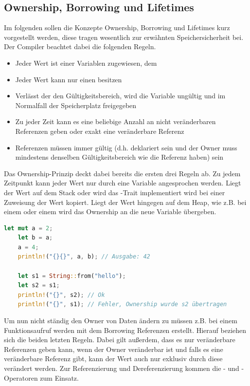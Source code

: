 \documentclass[11pt,a4paper, ngerman]{article}
\begin{document}
\subsection{Ownership, Borrowing und Lifetimes}
Im folgenden sollen die Konzepte Ownership, Borrowing und Lifetimes kurz vorgestellt werden, diese tragen wesentlich zur erwähnten Speichersicherheit bei. Der Compiler beachtet dabei die folgenden Regeln.

\begin{itemize}
    \item Jeder Wert ist einer Variablen zugewiesen, dem 
    \item Jeder Wert kann nur einen  besitzen
    \item Verlässt der  den Gültigkeitsbereich, wird die Variable ungültig und im Normalfall der Speicherplatz freigegeben
    \item Zu jeder Zeit kann es eine beliebige Anzahl an nicht veränderbaren Referenzen geben oder exakt eine veränderbare Referenz
    \item Referenzen müssen immer gültig (d.h. deklariert sein und der Owner muss mindestens denselben Gültigkeitsbereich wie die Referenz haben) sein
\end{itemize}

Das Ownership-Prinzip deckt dabei bereits die ersten drei Regeln ab. Zu jedem Zeitpunkt kann jeder Wert nur durch eine Variable angesprochen werden. Liegt der Wert auf dem Stack oder wird das -Trait implementiert wird bei einer Zuweisung der Wert kopiert. Liegt der Wert hingegen auf dem Heap, wie z.B. bei einem  oder einem  wird das Ownership an die neue Variable übergeben.

\begin{lstlisting}[language=rust, caption={ownership}]
    let mut a = 2;
    let b = a;
    a = 4;
    println!("{}{}", a, b); // Ausgabe: 42

    let s1 = String::from("hello");
    let s2 = s1;
    println!("{}", s2); // Ok
    println!("{}", s1); // Fehler, Ownership wurde s2 übertragen
\end{lstlisting}

Um nun nicht ständig den Owner von Daten ändern zu müssen z.B. bei einem Funktionsaufruf werden mit dem Borrowing Referenzen erstellt. Hierauf beziehen sich die beiden letzten Regeln. Dabei gilt außerdem, dass es nur veränderbare Referenzen geben kann, wenn der Owner veränderbar ist und falls es eine veränderbare Referenz gibt, kann der Wert auch nur exklusiv durch diese verändert werden. Zur Referenzierung und Dereferenzierung kommen die \codeword{&}- und \codeword{*}-Operatoren zum Einsatz.
\end{document}
